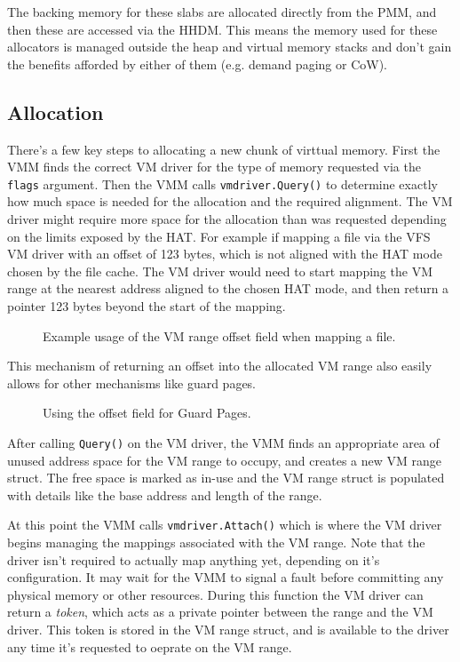 The backing memory for these slabs are allocated directly from the PMM, and then these are accessed via the HHDM. This means the memory used for these allocators is managed outside the heap and virtual memory stacks and don't gain the benefits afforded by either of them (e.g. demand paging or CoW).

\subsection{Allocation}
There's a few key steps to allocating a new chunk of virttual memory. First the VMM finds the correct VM driver for the type of memory requested via the \verb|flags| argument. Then the VMM calls \verb|vmdriver.Query()| to determine exactly how much space is needed for the allocation and the required alignment. The VM driver might require more space for the allocation than was requested depending on the limits exposed by the HAT. For example if mapping a file via the VFS VM driver with an offset of 123 bytes, which is not aligned with the HAT mode chosen by the file cache. The VM driver would need to start mapping the VM range at the nearest address aligned to the chosen HAT mode, and then return a pointer 123 bytes beyond the start of the mapping.

\begin{figure}[h]
\centering
\caption{Example usage of the VM range offset field when mapping a file.}
\end{figure}

This mechanism of returning an offset into the allocated VM range also easily allows for other mechanisms like guard pages.

\begin{figure}[h]
\centering
\caption{Using the offset field for Guard Pages.}
\end{figure}

After calling \verb|Query()| on the VM driver, the VMM finds an appropriate area of unused address space for the VM range to occupy, and creates a new VM range struct. The free space is marked as in-use and the VM range struct is populated with details like the base address and length of the range.

At this point the VMM calls \verb|vmdriver.Attach()| which is where the VM driver begins managing the mappings associated with the VM range. Note that the driver isn't required to actually map anything yet, depending on it's configuration. It may wait for the VMM to signal a fault before committing any physical memory or other resources. During this function the VM driver can return a \textit{token}, which acts as a private pointer between the range and the VM driver. This token is stored in the VM range struct, and is available to the driver any time it's requested to oeprate on the VM range.

